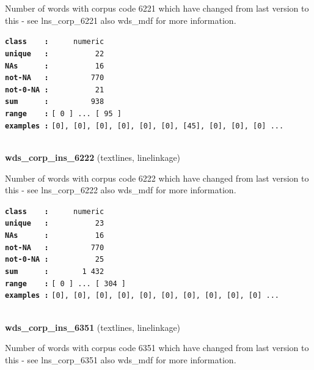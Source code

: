\documentclass[]{article}
\begin{document}
Number of words with corpus code 6221 which have changed from last
version to this - see lns\_corp\_6221 also wds\_mdf for more
information.

\textbf{\texttt{class\ \ \ \ :}} \texttt{~~~~~numeric}\\
\textbf{\texttt{unique\ \ \ :}} \texttt{~~~~~~~~~~22}\\
\textbf{\texttt{NAs\ \ \ \ \ \ :}} \texttt{~~~~~~~~~~16}\\
\textbf{\texttt{not-NA\ \ \ :}} \texttt{~~~~~~~~~770}\\
\textbf{\texttt{not-0-NA\ :}} \texttt{~~~~~~~~~~21}\\
\textbf{\texttt{sum\ \ \ \ \ \ :}} \texttt{~~~~~~~~~938}\\
\textbf{\texttt{range\ \ \ \ :}}
\texttt{{[}\ 0\ {]}\ ...\ {[}\ 95\ {]}}\\
\textbf{\texttt{examples\ :}}
\texttt{{[}0{]},\ {[}0{]},\ {[}0{]},\ {[}0{]},\ {[}0{]},\ {[}0{]},\ {[}45{]},\ {[}0{]},\ {[}0{]},\ {[}0{]}\ ...}\\

~

\textbf{wds\_corp\_ins\_6222} (textlines, linelinkage)

Number of words with corpus code 6222 which have changed from last
version to this - see lns\_corp\_6222 also wds\_mdf for more
information.

\textbf{\texttt{class\ \ \ \ :}} \texttt{~~~~~numeric}\\
\textbf{\texttt{unique\ \ \ :}} \texttt{~~~~~~~~~~23}\\
\textbf{\texttt{NAs\ \ \ \ \ \ :}} \texttt{~~~~~~~~~~16}\\
\textbf{\texttt{not-NA\ \ \ :}} \texttt{~~~~~~~~~770}\\
\textbf{\texttt{not-0-NA\ :}} \texttt{~~~~~~~~~~25}\\
\textbf{\texttt{sum\ \ \ \ \ \ :}} \texttt{~~~~~~~1~432}\\
\textbf{\texttt{range\ \ \ \ :}}
\texttt{{[}\ 0\ {]}\ ...\ {[}\ 304\ {]}}\\
\textbf{\texttt{examples\ :}}
\texttt{{[}0{]},\ {[}0{]},\ {[}0{]},\ {[}0{]},\ {[}0{]},\ {[}0{]},\ {[}0{]},\ {[}0{]},\ {[}0{]},\ {[}0{]}\ ...}\\

~

\textbf{wds\_corp\_ins\_6351} (textlines, linelinkage)

Number of words with corpus code 6351 which have changed from last
version to this - see lns\_corp\_6351 also wds\_mdf for more
information.
\end{document}
